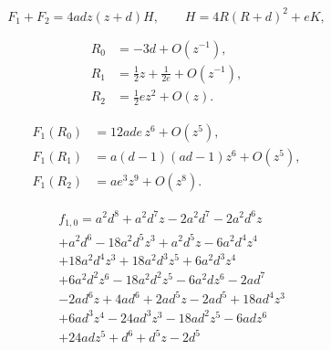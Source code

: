 
\begin{equation}\label{fnd:mu-short-cubic}
 F_1+F_2=4adz(z+d)H,
 \qquad H=4R(R+d)^2+eK,
\end{equation}

\begin{equation}\label{fnd:mu-newton-roots}
 \begin{aligned}
 R_0&=-3d+O(z^{-1}),\\
 R_1&=\tfrac12z+\tfrac1{2e}+O(z^{-1}),\\
 R_2&=\tfrac12ez^2+O(z).
 \end{aligned}
\end{equation}

\begin{equation}\label{fnd:mu-newton-values}
 \begin{aligned}
 F_1(R_0)&=12ade\,z^6+O(z^5),\\
 F_1(R_1)&=a(d-1)(ad-1)z^6+O(z^5),\\
 F_1(R_2)&=ae^3z^9+O(z^8).
 \end{aligned}
\end{equation}

\begin{equation}\begin{aligned}&f_{1,0}=a^{2} d^{8} + a^{2} d^{7} z - 2 a^{2} d^{7} - 2 a^{2} d^{6} z \\&+ a^{2} d^{6} - 18 a^{2} d^{5} z^{3} + a^{2} d^{5} z - 6 a^{2} d^{4} z^{4} \\&+ 18 a^{2} d^{4} z^{3} + 18 a^{2} d^{3} z^{5} + 6 a^{2} d^{3} z^{4} \\&+ 6 a^{2} d^{2} z^{6} - 18 a^{2} d^{2} z^{5} - 6 a^{2} d z^{6} - 2 a d^{7} \\&- 2 a d^{6} z + 4 a d^{6} + 2 a d^{5} z - 2 a d^{5} + 18 a d^{4} z^{3} \\&+ 6 a d^{3} z^{4} - 24 a d^{3} z^{3} - 18 a d^{2} z^{5} - 6 a d z^{6} \\&+ 24 a d z^{5} + d^{6} + d^{5} z - 2 d^{5}\end{aligned}\end{equation}

